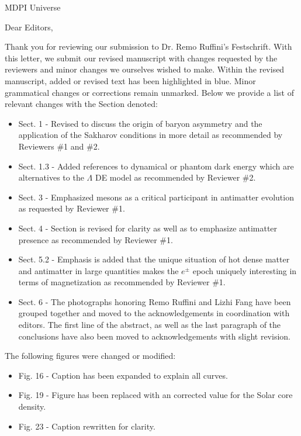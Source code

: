 \documentclass[a4paper, 10pt]{letter}
\begin{document}
\begin{letter}{MDPI Universe}

\opening{Dear Editors,}

Thank you for reviewing our submission to Dr. Remo Ruffini's Festschrift. With this letter, we submit our revised manuscript with changes requested by the reviewers and minor changes we ourselves wished to make. Within the revised manuscript, added or revised text has been highlighted in blue. Minor grammatical changes or corrections remain unmarked. Below we provide a list of relevant changes with the Section denoted:

\begin{itemize}
    \item Sect. 1 - Revised to discuss the origin of baryon asymmetry and the application of the Sakharov conditions in more detail as recommended by Reviewers \#1 and \#2.
    \item Sect. 1.3 - Added references to dynamical or phantom dark energy which are alternatives to the $\Lambda$ DE model as recommended by Reviewer \#2.
    \item Sect. 3 - Emphasized mesons as a critical participant in antimatter evolution as requested by Reviewer \#1.
    \item Sect. 4 - Section is revised for clarity as well as to emphasize antimatter presence as recommended by Reviewer \#1.
    \item Sect. 5.2 - Emphasis is added that the unique situation of hot dense matter and antimatter in large quantities makes the $e^{\pm}$ epoch uniquely interesting in terms of magnetization as recommended by Reviewer \#1.
    \item Sect. 6 - The photographs honoring Remo Ruffini and Lizhi Fang have been grouped together and moved to the acknowledgements in coordination with editors. The first line of the abstract, as well as the last paragraph of the conclusions have also been moved to acknowledgements with slight revision.
\end{itemize}

The following figures were changed or modified:
\begin{itemize}
    \item Fig. 16 - Caption has been expanded to explain all curves.
    \item Fig. 19 - Figure has been replaced with an corrected value for the Solar core density.
    \item Fig. 23 - Caption rewritten for clarity.
\end{itemize}


\end{letter}
\end{document}
